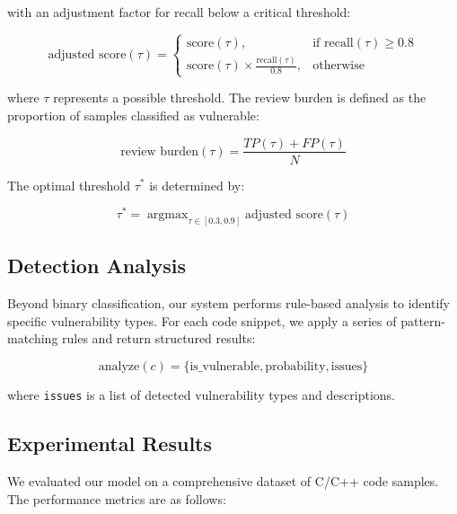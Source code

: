 \documentclass{article}
\DeclareMathOperator*{\argmax}{argmax}
\begin{document}
with an adjustment factor for recall below a critical threshold:

\begin{equation}
    \text{adjusted score}(\tau) = 
    \begin{cases}
        \text{score}(\tau), & \text{if recall}(\tau) \geq 0.8 \\
        \text{score}(\tau) \times \frac{\text{recall}(\tau)}{0.8}, & \text{otherwise}
    \end{cases}
\end{equation}

where $\tau$ represents a possible threshold. The review burden is defined as the proportion of samples classified as vulnerable:

\begin{equation}
    \text{review burden}(\tau) = \frac{TP(\tau) + FP(\tau)}{N}
\end{equation}

The optimal threshold $\tau^*$ is determined by:

\begin{equation}
    \tau^* = \argmax_{\tau \in [0.3, 0.9]} \text{adjusted score}(\tau)
\end{equation}

\subsection{Detection Analysis}

Beyond binary classification, our system performs rule-based analysis to identify specific vulnerability types. For each code snippet, we apply a series of pattern-matching rules and return structured results:

\begin{equation}
    \text{analyze}(c) = \{\text{is\_vulnerable}, \text{probability}, \text{issues}\}
\end{equation}

where \texttt{issues} is a list of detected vulnerability types and descriptions.

\subsection{Experimental Results}

We evaluated our model on a comprehensive dataset of C/C++ code samples. The performance metrics are as follows:
\end{document}
